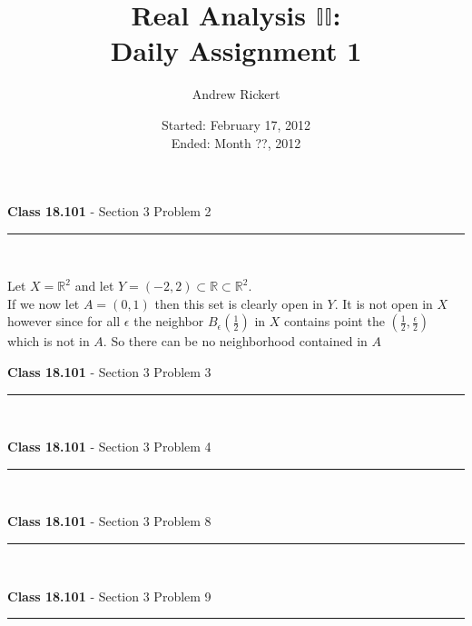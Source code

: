 \documentclass[11pt,reqno]{article}
\title{Real Analysis $\mathbb{II}$: \\ Daily Assignment 1}
\author{Andrew Rickert}
\date{Started: February 17, 2012 \\ \hspace{1pt} Ended: Month ??,  2012}                                           %
\begin{document}
\maketitle


\begin{flushleft} 
\textbf{Class 18.101} - Section 3 Problem 2\\
\rule{500pt}{1pt}\\
\end{flushleft} 

Let $X = \mathbb{R}^2$ and let $Y = (-2,2) \subset \mathbb{R} \subset \mathbb{R}^2$.\\
If we now let $A = (0,1)$ then this set is clearly open in $Y$. It is not open in $X$ however since for all $\epsilon$ the neighbor $B_\epsilon(\frac{1}{2})$ in $X$ contains point the $(\frac{1}{2},\frac{\epsilon}{2})$ which is not in $A$. So there can be no neighborhood contained in $A$\\

\begin{flushleft} 
\textbf{Class 18.101} - Section 3 Problem 3\\
\rule{500pt}{1pt}\\
\end{flushleft} 

\begin{flushleft} 
\textbf{Class 18.101} - Section 3 Problem 4\\
\rule{500pt}{1pt}\\
\end{flushleft} 

\begin{flushleft} 
\textbf{Class 18.101} - Section 3 Problem 8\\
\rule{500pt}{1pt}\\
\end{flushleft} 

\begin{flushleft} 
\textbf{Class 18.101} - Section 3 Problem 9\\
\rule{500pt}{1pt}\\
\end{flushleft} 
\end{document}
